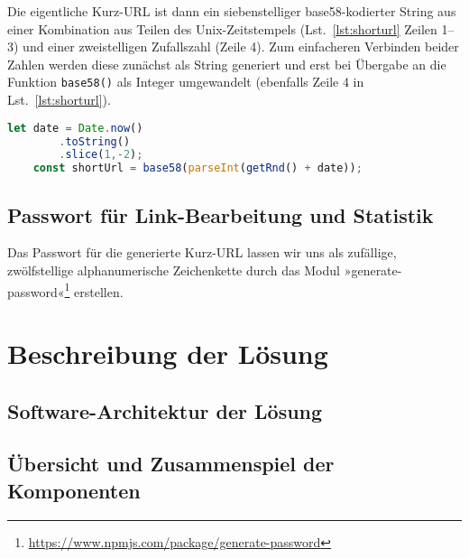 \documentclass[a4paper,11pt,DIV=12,overfullrule=on]{scrreprt}%
\begin{document}
Die eigentliche Kurz-\ac{URL} ist dann ein siebenstelliger base58-kodierter String aus einer Kombination aus Teilen des Unix-Zeitstempels (Lst.~\ref{lst:shorturl} Zeilen 1–3) und einer zweistelligen Zufallszahl (Zeile 4). Zum einfacheren Verbinden beider Zahlen werden diese zunächst als String generiert und erst bei Übergabe an die Funktion \texttt{base58()} als Integer umgewandelt (ebenfalls Zeile 4 in Lst.~\ref{lst:shorturl}).

\begin{lstlisting}[language=JavaScript,
    caption={Aufbau der Basis vor der base58-Konvertierung},
    label={lst:shorturl},
    float=h,
    gobble=4
]
    let date = Date.now()
        .toString()
        .slice(1,-2);
    const shortUrl = base58(parseInt(getRnd() + date));
\end{lstlisting}



\section{Passwort für Link-Bearbeitung und Statistik}
Das Passwort für die generierte Kurz-\ac{URL} lassen wir uns als zufällige, zwölfstellige alphanumerische Zeichenkette durch das Modul »generate-password«\footnote{\href{https://www.npmjs.com/package/generate-password}{https://www.npmjs.com/package/generate-password}} erstellen.


\chapter{Beschreibung der Lösung}
\section{Software-Architektur der Lösung}
\section{Übersicht und Zusammenspiel der Komponenten}
\end{document}
